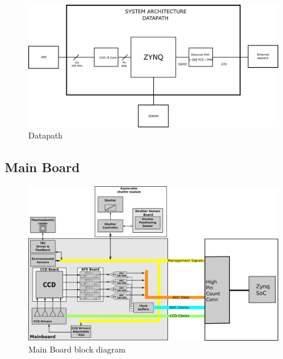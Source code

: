 \begin{figure}[H]
\centering
\includegraphics[width=\textwidth]{pict/datapath.png}
\caption{Datapath}
\label{fig:datapath}
\end{figure}


\subsection{Main Board}

\begin{figure}[H]
\centering
\includegraphics[width=\textwidth]{pict/mainbrd.png}
\caption{Main Board block diagram}
\label{fig:mainbrd}
\end{figure}

